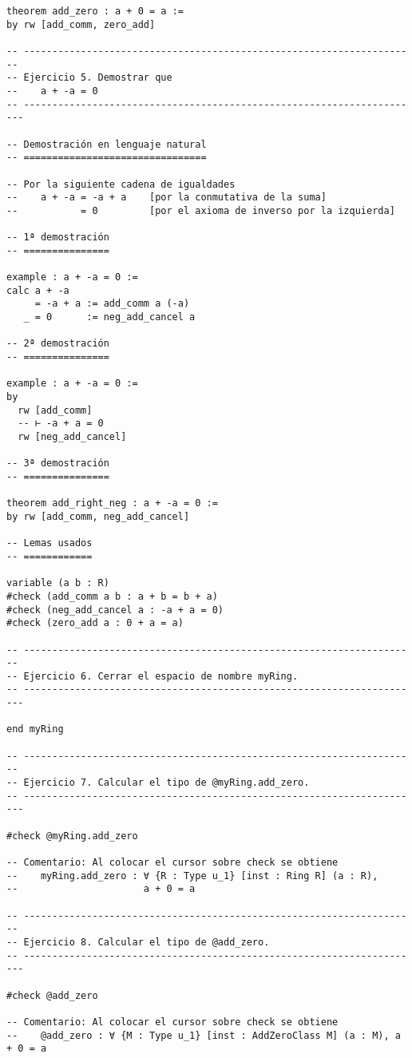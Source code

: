\begin{verbatim}
theorem add_zero : a + 0 = a :=
by rw [add_comm, zero_add]

-- ---------------------------------------------------------------------
-- Ejercicio 5. Demostrar que
--    a + -a = 0
-- ----------------------------------------------------------------------

-- Demostración en lenguaje natural
-- ================================

-- Por la siguiente cadena de igualdades
--    a + -a = -a + a    [por la conmutativa de la suma]
--           = 0         [por el axioma de inverso por la izquierda]

-- 1ª demostración
-- ===============

example : a + -a = 0 :=
calc a + -a
     = -a + a := add_comm a (-a)
   _ = 0      := neg_add_cancel a

-- 2ª demostración
-- ===============

example : a + -a = 0 :=
by
  rw [add_comm]
  -- ⊢ -a + a = 0
  rw [neg_add_cancel]

-- 3ª demostración
-- ===============

theorem add_right_neg : a + -a = 0 :=
by rw [add_comm, neg_add_cancel]

-- Lemas usados
-- ============

variable (a b : R)
#check (add_comm a b : a + b = b + a)
#check (neg_add_cancel a : -a + a = 0)
#check (zero_add a : 0 + a = a)

-- ---------------------------------------------------------------------
-- Ejercicio 6. Cerrar el espacio de nombre myRing.
-- ----------------------------------------------------------------------

end myRing

-- ---------------------------------------------------------------------
-- Ejercicio 7. Calcular el tipo de @myRing.add_zero.
-- ----------------------------------------------------------------------

#check @myRing.add_zero

-- Comentario: Al colocar el cursor sobre check se obtiene
--    myRing.add_zero : ∀ {R : Type u_1} [inst : Ring R] (a : R),
--                      a + 0 = a

-- ---------------------------------------------------------------------
-- Ejercicio 8. Calcular el tipo de @add_zero.
-- ----------------------------------------------------------------------

#check @add_zero

-- Comentario: Al colocar el cursor sobre check se obtiene
--    @add_zero : ∀ {M : Type u_1} [inst : AddZeroClass M] (a : M), a + 0 = a
\end{verbatim}

